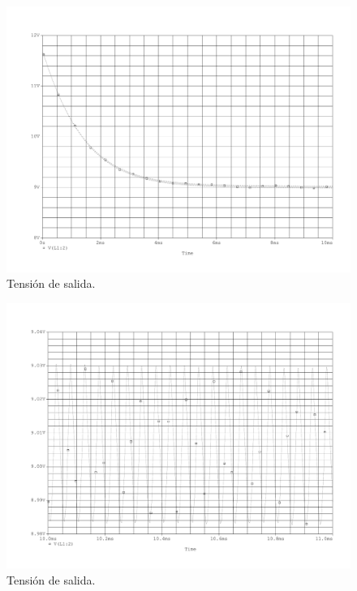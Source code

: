 
\begin{figure}[H]
	\centering
	\includegraphics[scale=0.5]{Figuras/ej1_vo.pdf}
	\caption{Tensión de salida.}
	\label{fig:sim_ej1_vo}
\end{figure}

\begin{figure}[H]
	\centering
	\includegraphics[scale=0.5]{Figuras/ej1_vo_zoom.pdf}
	\caption{Tensión de salida.}
	\label{fig:sim_ej1_vo_zoom}
\end{figure}


